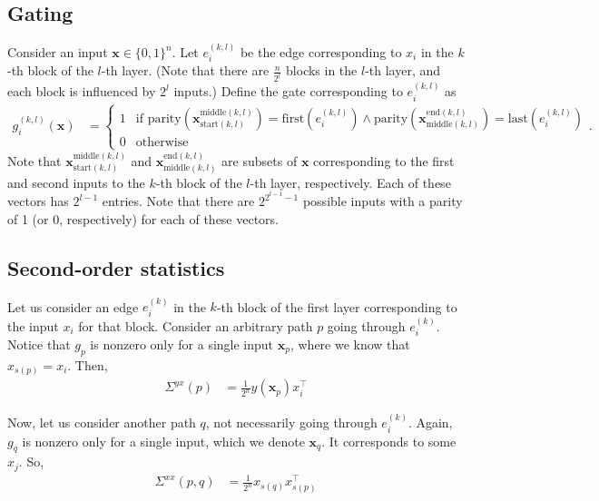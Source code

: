 \documentclass{article}
\begin{document}
\subsection*{Gating}
Consider an input $\mathbf{x} \in \{ 0,1 \}^n$.
Let $e_i^{(k,l)}$ be the edge corresponding to $x_i$ in the $k$-th block of the $l$-th layer.
(Note that there are $\frac{n}{2^l}$ blocks in the $l$-th layer, and each block is influenced by $2^l$ inputs.)
Define the gate corresponding to $e_i^{(k,l)}$ as
\begin{align}
  g_i^{(k,l)}(\mathbf{x})
  &= 
  \begin{cases}
    1 & \text{if } \text{parity}( \mathbf{x}_{\text{start}(k,l)}^{\text{middle}(k,l)} ) = \text{first}( e_i^{(k,l)} ) \land \text{parity}( \mathbf{x}_{\text{middle}(k,l)}^{\text{end}(k,l)} ) = \text{last}( e_i^{(k,l)} ) \\
    0 & \text{otherwise}
  \end{cases}.
\end{align}
Note that $\mathbf{x}_{\text{start}(k,l)}^{\text{middle}(k,l)}$ and $\mathbf{x}_{\text{middle}(k,l)}^{\text{end}(k,l)}$ are subsets of $\mathbf{x}$ corresponding to the first and second inputs to the $k$-th block of the $l$-th layer, respectively.
Each of these vectors has $2^{l-1}$ entries.
Note that there are $2^{2^{l-1}-1}$ possible inputs with a parity of 1 (or 0, respectively) for each of these vectors.



\subsection*{Second-order statistics}
Let us consider an edge $e_i^{(k)}$ in the $k$-th block of the first layer corresponding to the input $x_i$ for that block.
Consider an arbitrary path $p$ going through $e_i^{(k)}$.
Notice that $g_p$ is nonzero only for a single input $\mathbf{x}_p$, where we know that $x_{s(p)} = x_i$.
Then,
\begin{align}
  \Sigma^{yx}(p)
  &= \frac{1}{2^n} y(\mathbf{x}_p) x_i^\top
\end{align}

Now, let us consider another path $q$, not necessarily going through $e_i^{(k)}$.
Again, $g_q$ is nonzero only for a single input, which we denote $\mathbf{x}_q$.
It corresponds to some $x_j$.
So,
\begin{align}
  \Sigma^{xx}(p,q)
  &= \frac{1}{2^n} x_{s(q)} x_{s(p)}^\top
\end{align}
\end{document}

